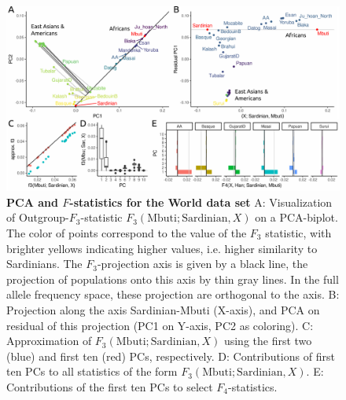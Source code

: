 \documentclass[12pt,fullpage, a4paper]{article}
\begin{document}
\begin{figure}[!ht]
	\includegraphics[width=\textwidth]{figures/fig_data_world.pdf}	
	\caption{\textbf{PCA and $F$-statistics for the World data set} A: Visualization of Outgroup-$F_3$-statistic $F_3(\text{Mbuti}; \text{Sardinian}, X)$ on a PCA-biplot. The color of points correspond to the value of the $F_3$ statistic, with brighter yellows indicating higher values, i.e. higher similarity to Sardinians. The $F_3$-projection axis is given by a black line, the projection of populations onto this axis by thin gray lines. In the full allele frequency  space, these projection are orthogonal to the axis. B: Projection along the axis Sardinian-Mbuti (X-axis), and PCA on residual of this projection (PC1 on Y-axis, PC2 as coloring). C: Approximation of $F_3(\text{Mbuti}; \text{Sardinian}, X)$ using the first two (blue) and first ten (red) PCs, respectively. D: Contributions of first ten PCs to all statistics of the form $F_3(\text{Mbuti}; \text{Sardinian}, X)$. E: Contributions of the first ten PCs to select $F_4$-statistics.  
	}	
	\label{fig:world}
\end{figure}


\end{document}
